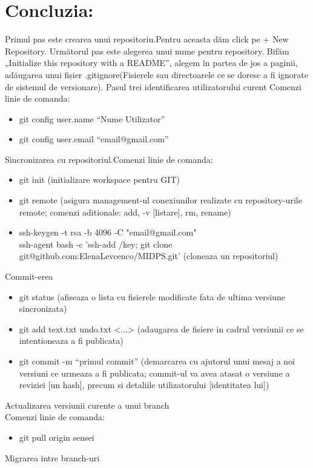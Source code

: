\documentclass[12pt]{article}
\begin{document}
\section{Concluzia:}
Primul pas este crearea unui repositoriu.Pentru aceasta dăm click pe + New Repository.
Următorul pas este alegerea unui nume pentru repository. Bifăm „Initialize this repository with a README”, alegem în partea de jos a paginii, adăugarea unui fișier .gitignore(Fisierele sau directoarele ce se doresc a fi ignorate de sistemul de versionare).
Pasul trei identificarea utilizatorului curent
Comenzi linie de comanda:\\
\begin{itemize}
\item git config user.name “Nume Utilizator”
\item git config user.email “email@gmail.com”
\end{itemize}
Sincronizarea cu repositoriul.Comenzi linie de comanda:
\begin{itemize}
\item git init (initializare workspace pentru GIT) 
\item git remote (asigura management-ul conexiunilor realizate cu repository-urile remote;
comenzi aditionale: add, -v [listare], rm, rename)
\item 
ssh-keygen -t rsa -b 4096 -C "email@gmail.com" \\
ssh-agent bash -c 'ssh-add /key; git clone git@github.com:ElenaLevcenco/MIDPS.git' (cloneaza un repositoriul)
\end{itemize}
Commit-erea
\begin{itemize}
\item git status (afiseaza o lista cu fisierele modificate fata de ultima versiune sincronizata)
\item git add text.txt undo.txt <...> (adaugarea de fisiere in cadrul versiunii ce se
intentioneaza a fi publicata)
\item git commit -m “primul commit” (demarcarea cu ajutorul unui mesaj a noi versiuni ce
urmeaza a fi publicata; commit-ul va avea atasat o versiune a reviziei [un hash], precum si
detaliile utilizatorului [identitatea lui])
\end{itemize}
Actualizarea versiunii curente a unui branch\\
Comenzi linie de comanda:
\begin{itemize}
\item git pull origin sensei
\end{itemize}
Migrarea intre branch-uri\\
\end{document}
